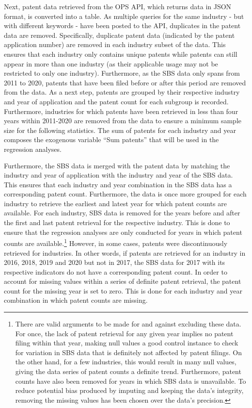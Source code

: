 \documentclass[
  12pt,
  a4paperpaper,
]{article}
\begin{document}
Next, patent data retrieved from the OPS API, which returns data in JSON
format, is converted into a table. As multiple queries for the same
industry - but with different keywords - have been posted to the API,
duplicates in the patent data are removed. Specifically, duplicate
patent data (indicated by the patent application number) are removed in
each industry subset of the data. This ensures that each industry only
contains unique patents while patents can still appear in more than one
industry (as their applicable usage may not be restricted to only one
industry). Furthermore, as the SBS data only spans from 2011 to 2020,
patents that have been filed before or after this period are removed
from the data. As a next step, patents are grouped by their respective
industry and year of application and the patent count for each subgroup
is recorded. Furthermore, industries for which patents have been
retrieved in less than four years within 2011-2020 are removed from the
data to ensure a minimum sample size for the following statistics. The
sum of patents for each industry and year composes the exogenous
variable ``Sum patents'' that will be used in the regression analyses.

Furthermore, the SBS data is merged with the patent data by matching the
industry and year of application with the industry and year of the SBS
data. This ensures that each industry and year combination in the SBS
data has a corresponding patent count. Furthermore, the data is once
more grouped for each industry to retrieve the earliest and latest year
for which patent counts are available. For each industry, SBS data is
removed for the years before and after the first and last patent
retrieval for the respective industry. This is done to ensure that the
regression analyses are only conducted for years in which patent counts
are available.\footnote{There are valid arguments to be made for and
  against excluding these data. For once, the lack of patent retrieval
  for any given year implies no patent filing within that year, making
  null values a good control instance to check for variation in SBS data
  that is definitely not affected by patent filings. On the other hand,
  for a few industries, this would result in many null values, giving
  the data series of patent counts a definite trend. Furthermore, patent
  counts have also been removed for years in which SBS data is
  unavailable. To reduce potential bias produced by imputing and keeping
  the data's integrity, removing the missing values has been chosen over
  the data's precision.} However, in some cases, patents were
discontinuously retrieved for industries. In other words, if patents are
retrieved for an industry in 2016, 2018, 2019 and 2020 but not in 2017,
the SBS data for 2017 with its respective indicators do not have a
corresponding patent count. In order to account for missing values
within a series of definite patent retrieval, the patent count for the
missing year is set to zero. This is done for each industry and year
combination in which patent counts are
missing.\label{cleaning-missing-values}
\end{document}
